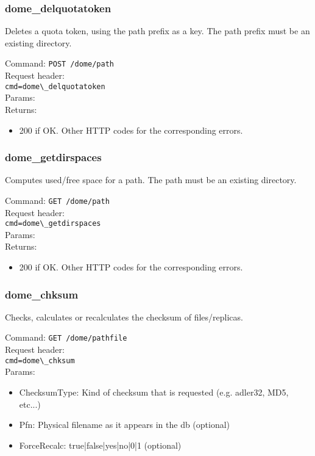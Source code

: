 \documentclass[a4paper,10pt]{scrreprt}
\begin{document}
\subsubsection{dome\_delquotatoken}
Deletes a quota token, using the path prefix as a key. The path prefix must be an existing directory.

Command:
\lstinline"POST /dome/path"\\
Request header:\\
\lstinline"cmd=dome\_delquotatoken"\\
Params:\\

Returns:
\begin{itemize}
 \item 200 if OK. Other HTTP codes for the corresponding errors.
\end{itemize}




\subsubsection{dome\_getdirspaces}
Computes used/free space for a path. The path must be an existing directory.

Command:
\lstinline"GET /dome/path"\\
Request header:\\
\lstinline"cmd=dome\_getdirspaces"\\
Params:\\

Returns:
\begin{itemize}
 \item 200 if OK. Other HTTP codes for the corresponding errors.
\end{itemize}





\subsubsection{dome\_chksum}
 Checks, calculates or recalculates the checksum of files/replicas.
 

Command:
\lstinline"GET /dome/pathfile"\\
Request header:\\
\lstinline"cmd=dome\_chksum"\\
Params:
\begin{itemize}
 \item ChecksumType: Kind of checksum that is requested (e.g. adler32, MD5, etc...)
 \item Pfn: Physical filename as it appears in the db (optional)
 \item ForceRecalc: true|false|yes|no|0|1 (optional)
\end{itemize}
\end{document}
